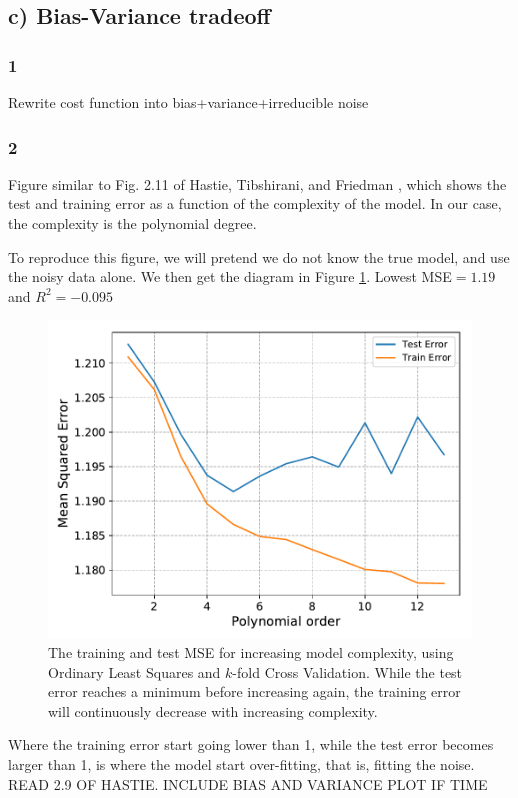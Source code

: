 \documentclass[a4paper,10pt,english]{article}
\begin{document}
\subsection{c) Bias-Variance tradeoff}
\subsubsection{1}
Rewrite cost function into bias+variance+irreducible noise
\subsubsection{2}
 Figure similar to Fig. 2.11 of Hastie, Tibshirani, and Friedman
 , which shows the test and training error as a function of the complexity of the model. In our case, the complexity is the polynomial degree.
 
 To reproduce this figure, we will pretend we do not know the true model, and use the noisy data alone. We then get the diagram in Figure \ref{fig:2}. Lowest MSE$= 1.19$ and $R^2=-0.095$
 
 \begin{figure}[H]
 	\centering
 	\includegraphics[scale=0.7]{c_OLSerr_train_test_vs_pdegree.pdf}
 	\caption{The training and test MSE for increasing model complexity, using Ordinary Least Squares and $k$-fold Cross Validation. While the test error reaches a minimum before increasing again, the training error will continuously decrease with increasing complexity.}
 	\label{fig:2}
 \end{figure}

Where the training error start going lower than 1, while the test error becomes larger than 1, is where the model start over-fitting, that is, fitting the noise. READ 2.9 OF HASTIE. INCLUDE BIAS AND VARIANCE PLOT IF TIME
\end{document}
